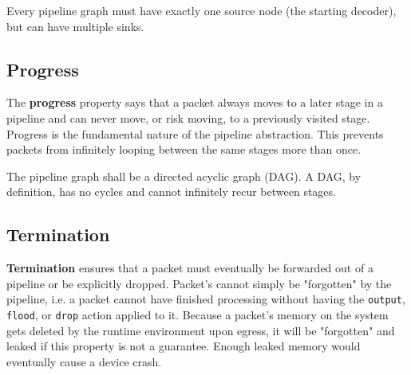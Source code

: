 Every pipeline graph must have exactly one source node (the starting decoder), but can have multiple sinks.

\subsection{Progress} \label{progress_guide}

The \textbf{progress} property says that a packet always moves to a later stage in a pipeline and can never move, or risk moving, to a previously visited stage. Progress is the fundamental nature of the pipeline abstraction. This prevents packets from infinitely looping between the same stages more than once. 

The pipeline graph shall be a directed acyclic graph (DAG). A DAG, by definition, has no cycles and cannot infinitely recur between stages.

%
%

\subsection{Termination} \label{termination_guide}

\textbf{Termination} ensures that a packet must eventually be forwarded out of a pipeline or be explicitly dropped. Packet's cannot simply be "forgotten" by the pipeline, i.e. a packet cannot have finished processing without having the \texttt{output}, \texttt{flood}, or \texttt{drop} action applied to it. Because a packet's memory on the system gets deleted by the runtime environment upon egress, it will be "forgotten" and leaked if this property is not a guarantee. Enough leaked memory would eventually cause a device crash.

